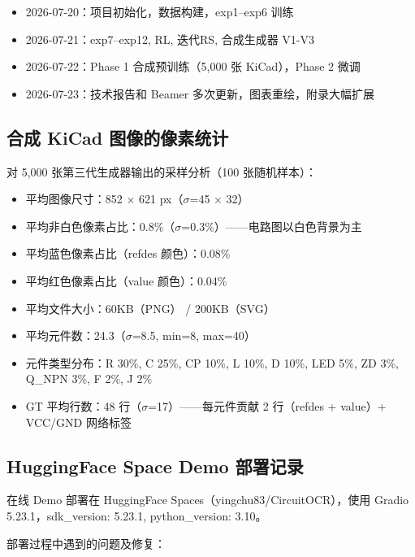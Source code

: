\begin{itemize}[nosep]
    \item 2026-07-20：项目初始化，数据构建，exp1--exp6 训练
    \item 2026-07-21：exp7--exp12, RL, 迭代RS, 合成生成器 V1-V3
    \item 2026-07-22：Phase 1 合成预训练（5,000 张 KiCad），Phase 2 微调
    \item 2026-07-23：技术报告和 Beamer 多次更新，图表重绘，附录大幅扩展
\end{itemize}

\subsection{合成 KiCad 图像的像素统计}

对 5,000 张第三代生成器输出的采样分析（100 张随机样本）：

\begin{itemize}[nosep]
    \item 平均图像尺寸：852 $\times$ 621 px（$\sigma$=45 $\times$ 32）
    \item 平均非白色像素占比：0.8\%（$\sigma$=0.3\%）——电路图以白色背景为主
    \item 平均蓝色像素占比（refdes 颜色）：0.08\%
    \item 平均红色像素占比（value 颜色）：0.04\%
    \item 平均文件大小：60KB（PNG） / 200KB（SVG）
    \item 平均元件数：24.3（$\sigma$=8.5, min=8, max=40）
    \item 元件类型分布：R 30\%, C 25\%, CP 10\%, L 10\%, D 10\%, LED 5\%, ZD 3\%, Q\_NPN 3\%, F 2\%, J 2\%
    \item GT 平均行数：48 行（$\sigma$=17）——每元件贡献 2 行（refdes + value）+ VCC/GND 网络标签
\end{itemize}

\subsection{HuggingFace Space Demo 部署记录}

在线 Demo 部署在 HuggingFace Spaces（yingchu83/CircuitOCR），使用 Gradio 5.23.1，sdk\_version: 5.23.1, python\_version: 3.10。

部署过程中遇到的问题及修复：

